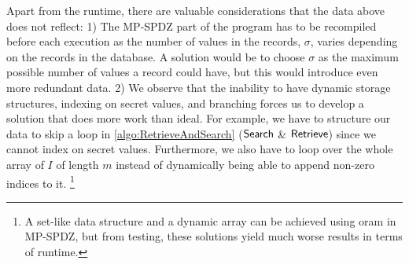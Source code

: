 Apart from the runtime, there are valuable considerations that the data above does not reflect: 1) The MP-SPDZ part of the program has to be recompiled before each execution as the number of values in the records, $ \sigma $, varies depending on the records in the database. A solution would be to choose $ \sigma $ as the maximum possible number of values a record could have, but this would introduce even more redundant data. 2) We observe that the inability to have dynamic storage structures, indexing on secret values, and branching forces us to develop a solution that does more work than ideal. For example, we have to structure our data to skip a loop in \cref{algo:RetrieveAndSearch} ($ \mathsf{{Search}} $ \& $ \mathsf{{Retrieve}} $) since we cannot index on secret values. Furthermore, we also have to loop over the whole array of $ I $ of length $ m $ instead of dynamically being able to append non-zero indices to it. \footnote{A set-like data structure and a dynamic array can be achieved using \acrshort{oram} in MP-SPDZ, but from testing, these solutions yield much worse results in terms of runtime.}

